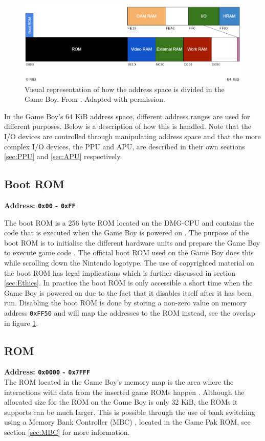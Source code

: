 \begin{figure}[H]
    \centering
    \includegraphics[width=\textwidth]{figures/Memory Map.PNG}
    \caption{Visual representation of how the address space is divided in the Game Boy. From \cite{ultimateGBtalkSlides}. Adapted with permission.}
    \label{fig:memory-map}
\end{figure}
In the Game Boy's 64 KiB address space, different address ranges are used for different purposes. Below is a description of how this is handled. Note that the I/O devices are controlled through manipulating address space and that the more complex I/O devices, the PPU and APU, are described in their own sections \ref{sec:PPU} and \ref{sec:APU} respectively.

\subsection{Boot ROM}
\textbf{Address: \texttt{0x00} - \texttt{0xFF}}

The boot ROM is a 256 byte ROM located on the DMG-CPU and contains the code that is executed when the Game Boy is powered on \cite{BootRom}. The purpose of the boot ROM is to initialise the different hardware units and prepare the Game Boy to execute game code \cite{bootstraptechopedia}. The official boot ROM used on the Game Boy does this while scrolling down the Nintendo logotype. The use of copyrighted material on the boot ROM has legal implications which is further discussed in section \ref{sec:Ethics}.
In practice the boot ROM is only accessible a short time when the Game Boy is powered on due to the fact that it disables itself after it has been run. 
Disabling the boot ROM is done by storing a non-zero value on memory address \texttt{0xFF50} and will map the addresses to the ROM instead, see the overlap in figure \ref{fig:memory-map}.

\subsection{ROM}
\textbf{Address: \texttt{0x0000} - \texttt{0x7FFF}}
\\
The ROM located in the Game Boy's memory map is the area where the interactions with data from the inserted game ROMs happen \cite{pandocsmemorymap}. 
Although the allocated size for the ROM on the Game Boy is only 32 KiB, the ROMs it supports can be much larger. This is possible through the use of bank switching using a Memory Bank Controller (MBC) \cite{pandocsexternalmemoryandhardware}, located in the Game Pak ROM, see section \ref{sec:MBC} for more information.


